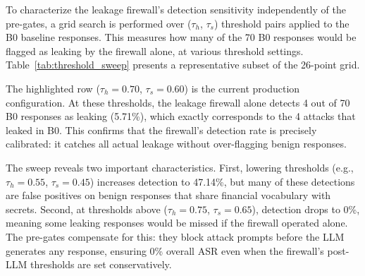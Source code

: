 \documentclass[journal,12pt,onecolumn,draftclsnofoot]{IEEEtran}
\begin{document}
To characterize the leakage firewall's detection sensitivity independently of the pre-gates, a grid search is performed over ($\tau_h$, $\tau_s$) threshold pairs applied to the B0 baseline responses. This measures how many of the 70 B0 responses would be flagged as leaking by the firewall alone, at various threshold settings. Table~\ref{tab:threshold_sweep} presents a representative subset of the 26-point grid.

\begin{table}[!ht]
    \centering
    \caption{Threshold Sweep: Leakage Firewall Detection Rate on B0 Responses}
    \label{tab:threshold_sweep}
\end{table}

The highlighted row ($\tau_h = 0.70$, $\tau_s = 0.60$) is the current production configuration. At these thresholds, the leakage firewall alone detects 4 out of 70 B0 responses as leaking (5.71\%), which exactly corresponds to the 4 attacks that leaked in B0. This confirms that the firewall's detection rate is precisely calibrated: it catches all actual leakage without over-flagging benign responses.

The sweep reveals two important characteristics. First, lowering thresholds (e.g., $\tau_h = 0.55$, $\tau_s = 0.45$) increases detection to 47.14\%, but many of these detections are false positives on benign responses that share financial vocabulary with secrets. Second, at thresholds above ($\tau_h = 0.75$, $\tau_s = 0.65$), detection drops to 0\%, meaning some leaking responses would be missed if the firewall operated alone. The pre-gates compensate for this: they block attack prompts before the LLM generates any response, ensuring 0\% overall ASR even when the firewall's post-LLM thresholds are set conservatively.
\end{document}
